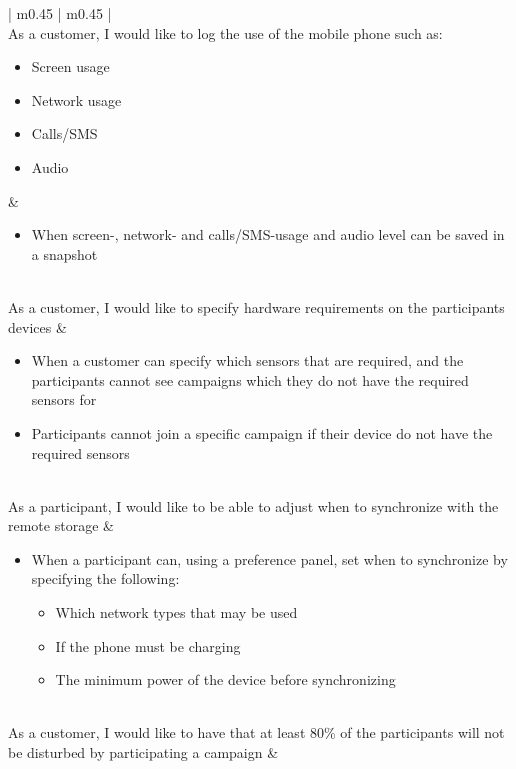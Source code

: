 \begin{center}
\begin{longtable}{| m{} | m{} |}
	 \\ \hline
	As a customer, I would like to log the use of the mobile phone such as:
	\begin{itemize}[noitemsep,topsep=0pt,parsep=0pt,partopsep=0pt]
		\item Screen usage 
		\item Network usage 
		\item Calls/SMS
		\item Audio
	\end{itemize} & 
	\begin{itemize}
		\item When screen-, network- and calls/SMS-usage and audio level can be saved in a snapshot
	\end{itemize} \\ \hline
	As a customer, I would like to specify hardware requirements on the participants devices &
	\begin{itemize}[noitemsep,topsep=0pt,parsep=0pt,partopsep=0pt]
		\item When a customer can specify which sensors that are required, and the participants cannot see campaigns which they do not have the required sensors for
		\item Participants cannot join a specific campaign if their device do not have the required sensors
	\end{itemize} \\ \hline
	As a participant, I would like to be able to adjust when to synchronize with the remote storage &
	\begin{itemize}[noitemsep,topsep=0pt,parsep=0pt,partopsep=0pt]
	 	\item When a participant can, using a preference panel, set when to synchronize by specifying the following:
	 	\begin{itemize}[noitemsep,topsep=0pt,parsep=0pt,partopsep=0pt]
	 		\item Which network types that may be used
	 		\item If the phone must be charging
	 		\item The minimum power of the device before synchronizing
	 	\end{itemize}
	 \end{itemize} \\ \hline
	 As a customer, I would like to have that at least 80\% of the participants will not be disturbed by participating a campaign &
	  \\ \hline
\caption{User stories and acceptance test.}
\label{tab:user_stories_and_acceptance_test}
\end{longtable}
\end{center}
